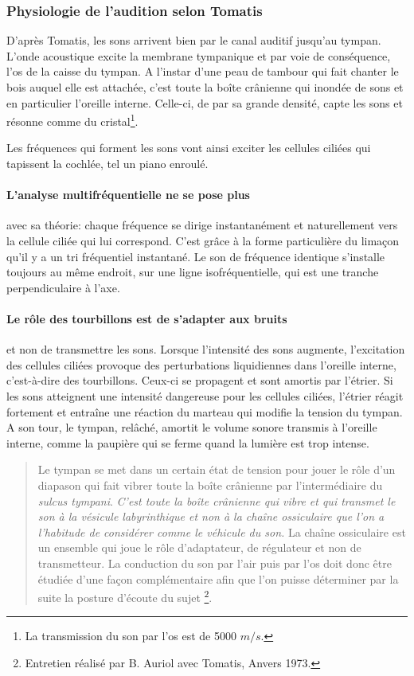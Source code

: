 \subsubsection{Physiologie de l'audition selon Tomatis}

D'après Tomatis, les sons arrivent bien par le canal auditif
jusqu'au tympan. L'onde acoustique excite la membrane tympanique et
par voie de conséquence, l'os de la caisse du tympan. 
A l'instar d'une
peau de tambour qui fait chanter le bois auquel elle est attachée,
c'est toute la boîte crânienne qui inondée de sons et en particulier
l'oreille interne. Celle-ci, de par sa grande densité, capte les sons
et résonne comme du cristal\footnote{La transmission du son par l'os est de 5000 $m/s$.}.

Les fréquences qui forment les sons vont ainsi exciter les cellules
ciliées qui tapissent la cochlée, tel un piano enroulé.

\paragraph{L'analyse multifréquentielle ne se pose plus}  
avec sa théorie: chaque fréquence se dirige instantanément et
naturellement vers la cellule ciliée qui lui correspond. 
C'est grâce à la forme particulière du limaçon qu'il y a un tri fréquentiel instantané.
Le son de fréquence identique s'installe toujours au même endroit, sur une ligne isofréquentielle, qui est une tranche perpendiculaire à l'axe.


\paragraph{Le rôle des tourbillons est de s'adapter aux bruits}
et non de transmettre les sons.
Lorsque l'intensité des sons aug\-men\-te,
l'ex\-ci\-ta\-tion des cellules ciliées provoque des perturbations liquidiennes
dans l'oreille interne, c'est-à-dire des tourbillons. Ceux-ci se propagent
et sont amortis par l'étrier. Si les sons atteignent une intensité
dangereuse pour les cellules ciliées, l'étrier réagit fortement et
entraîne une réaction du marteau qui modifie la tension du tympan.
A son tour, le tympan, relâché, amortit le volume sonore transmis
à l'oreille interne, comme la paupière qui se ferme quand la lumière
est trop intense.


\begin{quotation}
	Le tympan se met dans un certain état de tension pour jouer le
	rôle d'un diapason qui fait vibrer toute la boîte crânienne
	par l'intermédiaire du \emph{sulcus tympani}. 
	\emph{C'est toute la boîte crânienne qui vibre et qui transmet le son à la vésicule labyrinthique et non à la chaîne ossiculaire que l'on a l'habitude de considérer comme le véhicule du son.} La chaîne ossiculaire est un ensemble qui
	joue le rôle d'adaptateur, de régulateur et non de transmetteur. La
	conduction du son par l'air puis par l'os doit donc
	être étudiée d'une façon complémentaire afin que l'on
	puisse déterminer par la suite la posture d'écoute du sujet%
	\footnote{Entretien réalisé par B. Auriol avec Tomatis, Anvers 1973.}.

\end{quotation}


